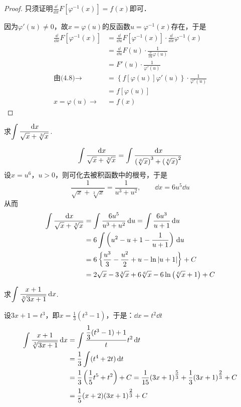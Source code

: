 \begin{proof}
只须证明$\frac{\dd}{\dd x}F[\varphi^{-1}(x)]=f(x)$即可．

因为$\varphi'(u)\ne 0$，故$x=\varphi(u)$的反函数$u=\varphi^{-1}(x)$存在，于是
\[\begin{split}
    \frac{\dd}{\dd x}F[\varphi^{-1}(x)]&=\frac{\dd}{\dd u}F[\varphi^{-1}(x)]\cdot \frac{\dd }{\dd x}\varphi^{-1}(x)\\
    &=\frac{\dd}{\dd u}F(u)\cdot \frac{1}{\frac{\dd}{\dd u}\varphi(u)}\\
    &=F'(u)\cdot \frac{1}{\varphi'(u)}\\
    \text{由(4.8)}\to &=\left\{f[\varphi(u)]\varphi'(u)\right\}\cdot \frac{1}{\varphi'(u)}\\
    &=f[\varphi(u)]\\
    x=\varphi(u)\to &=f(x)
\end{split}\]
\end{proof}


\begin{example}
    求$\displaystyle\int\dfrac{\,{\rm d} x}{\sqrt{x}+\sqrt[3]{x}}$.
\end{example}

\begin{solution}
    \[\displaystyle\int\dfrac{\,{\rm d} x}{\sqrt{x}+\sqrt[3]{x}}=\int \dfrac{\,{\rm d} x}{\left(\sqrt[6]{x}\right)^3+\left(\sqrt[6]{x}\right)^2}\]
设$x=u^6$，$u>0$，则可化去被积函数中的根号，于是
\[\frac{1}{\sqrt{x}+\sqrt[3]{x}}=\frac{1}{u^3+u^2},\qquad \dd x=6u^5\dd u\]
从而
\[\begin{split}
    \displaystyle\int\dfrac{\,{\rm d} x}{\sqrt{x}+\sqrt[3]{x}}&=\int \dfrac{6u^5}{u^3+u^2}\,{\rm d} u=\int\dfrac{6u^3}{u+1}\,{\rm d} u\\
    &=6\int \left(u^2-u+1-\dfrac{1}{u+1}\right)\,{\rm d} u\\
    &=6\left\{\dfrac{u^3}{3}-\dfrac{u^2}{2}+u-\ln|u+1|\right\}+C\\
    &=2\sqrt{x}-3\sqrt[3]{x}+6\sqrt[6]{x}-6\ln\left(\sqrt[6]{x}+1\right)+C
\end{split}
    \]
\end{solution}

\begin{example}
    求$\displaystyle\int \dfrac{x+1}{\sqrt[3]{3x+1}}\,{\rm d} x$.
\end{example}

\begin{solution}
    设$3x+1=t^3$，即$x=\frac{1}{3}(t^3-1)$，于是：$\dd x=t^2\dd t$
\[\begin{split}
    \displaystyle\int \dfrac{x+1}{\sqrt[3]{3x+1}}\,{\rm d} x&=\int \dfrac{\dfrac{1}{3}(t^3-1)+1}{t}t^2\,{\rm d} t\\
&=\dfrac{1}{3}\int (t^4+2t)\,{\rm d} t\\
&=\dfrac{1}{3}\left(\dfrac{1}{5}t^5+t^2\right)+C=\dfrac{1}{15}(3x+1)^{\tfrac{5}{3}}+\dfrac{1}{3}(3x+1)^{\tfrac{2}{3}}+C\\
&=\dfrac{1}{5}(x+2)(3x+1)^{\tfrac{2}{3}}+C
\end{split}\]
\end{solution}

